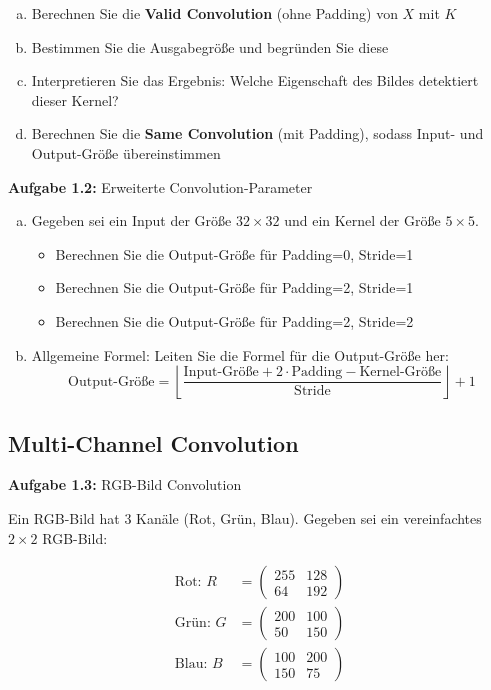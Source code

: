 \documentclass[12pt,a4paper]{article}
\begin{document}
\begin{enumerate}[(a)]
    \item Berechnen Sie die \textbf{Valid Convolution} (ohne Padding) von $X$ mit $K$
    \item Bestimmen Sie die Ausgabegröße und begründen Sie diese
    \item Interpretieren Sie das Ergebnis: Welche Eigenschaft des Bildes detektiert dieser Kernel?
    \item Berechnen Sie die \textbf{Same Convolution} (mit Padding), sodass Input- und Output-Größe übereinstimmen
\end{enumerate}

\textbf{Aufgabe 1.2:} Erweiterte Convolution-Parameter

\begin{enumerate}[(a)]
    \item Gegeben sei ein Input der Größe $32 \times 32$ und ein Kernel der Größe $5 \times 5$. 
    \begin{itemize}
        \item Berechnen Sie die Output-Größe für Padding=0, Stride=1
        \item Berechnen Sie die Output-Größe für Padding=2, Stride=1  
        \item Berechnen Sie die Output-Größe für Padding=2, Stride=2
    \end{itemize}
    \item Allgemeine Formel: Leiten Sie die Formel für die Output-Größe her:
    $$\text{Output-Größe} = \left\lfloor \frac{\text{Input-Größe} + 2 \cdot \text{Padding} - \text{Kernel-Größe}}{\text{Stride}} \right\rfloor + 1$$
\end{enumerate}

\subsection{Multi-Channel Convolution}

\textbf{Aufgabe 1.3:} RGB-Bild Convolution

Ein RGB-Bild hat 3 Kanäle (Rot, Grün, Blau). Gegeben sei ein vereinfachtes $2 \times 2$ RGB-Bild:

\begin{align}
\text{Rot: } R &= \begin{pmatrix} 255 & 128 \\ 64 & 192 \end{pmatrix} \\
\text{Grün: } G &= \begin{pmatrix} 200 & 100 \\ 50 & 150 \end{pmatrix} \\
\text{Blau: } B &= \begin{pmatrix} 100 & 200 \\ 150 & 75 \end{pmatrix}
\end{align}
\end{document}
